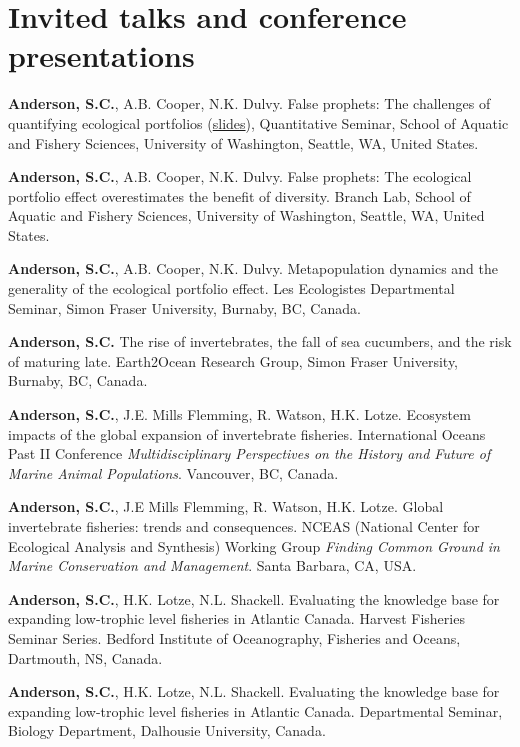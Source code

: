 \section{Invited talks and conference
presentations}\label{invited-talks-and-conference-presentations}

\begin{description}
\itemsep3pt\parskip0pt
\item[2013]
\textbf{Anderson, S.C.}, A.B. Cooper, N.K. Dulvy. False prophets: The
challenges of quantifying ecological portfolios
(\href{http://seananderson.ca/talks/2013/PE_SAFS_quantsem.pdf}{slides}),
Quantitative Seminar, School of Aquatic and Fishery Sciences, University
of Washington, Seattle, WA, United States.
\item[2012]
\textbf{Anderson, S.C.}, A.B. Cooper, N.K. Dulvy. False prophets: The
ecological portfolio effect overestimates the benefit of diversity.
Branch Lab, School of Aquatic and Fishery Sciences, University of
Washington, Seattle, WA, United States.
\item[2012]
\textbf{Anderson, S.C.}, A.B. Cooper, N.K. Dulvy. Metapopulation
dynamics and the generality of the ecological portfolio effect. Les
Ecologistes Departmental Seminar, Simon Fraser University, Burnaby, BC,
Canada.
\item[2010]
\textbf{Anderson, S.C.} The rise of invertebrates, the fall of sea
cucumbers, and the risk of maturing late. Earth2Ocean Research Group,
Simon Fraser University, Burnaby, BC, Canada.
\item[2009]
\textbf{Anderson, S.C.}, J.E. Mills Flemming, R. Watson, H.K. Lotze.
Ecosystem impacts of the global expansion of invertebrate fisheries.
International Oceans Past II Conference \emph{Multidisciplinary
Perspectives on the History and Future of Marine Animal Populations}.
Vancouver, BC, Canada.
\item[2009]
\textbf{Anderson, S.C.}, J.E Mills Flemming, R. Watson, H.K. Lotze.
Global invertebrate fisheries: trends and consequences. NCEAS (National
Center for Ecological Analysis and Synthesis) Working Group
\emph{Finding Common Ground in Marine Conservation and Management}.
Santa Barbara, CA, USA.
\item[2009]
\textbf{Anderson, S.C.}, H.K. Lotze, N.L. Shackell. Evaluating the
knowledge base for expanding low-trophic level fisheries in Atlantic
Canada. Harvest Fisheries Seminar Series. Bedford Institute of
Oceanography, Fisheries and Oceans, Dartmouth, NS, Canada.
\item[2008]
\textbf{Anderson, S.C.}, H.K. Lotze, N.L. Shackell. Evaluating the
knowledge base for expanding low-trophic level fisheries in Atlantic
Canada. Departmental Seminar, Biology Department, Dalhousie University,
Canada.
\end{description}

